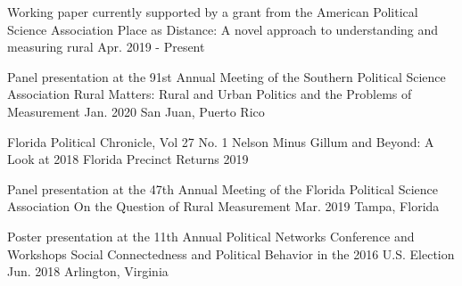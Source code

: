 

\begin{cventries}


\cventry
  {Working paper currently supported by a grant from the American Political Science Association} %
  {Place as Distance: A novel approach to understanding and measuring rural} %
  {Apr. 2019 - Present} %
  {} %
  {}

\vspace{-.25cm}
\cventry
  {Panel presentation at the 91st Annual Meeting of the Southern Political Science Association} %
  {Rural Matters: Rural and Urban Politics and the Problems of Measurement} %
  {Jan. 2020} %
  {San Juan, Puerto Rico} %
  {}

\vspace{-.25cm}
\cventry
  {Florida Political Chronicle, Vol 27 No. 1} %
  {Nelson Minus Gillum and Beyond: A Look at 2018 Florida Precinct Returns} %
  {2019} %
  {} %
  {}

\vspace{-.25cm}
\cventry
  {Panel presentation at the 47th Annual Meeting of the Florida Political Science Association} %
  {On the Question of Rural Measurement} %
  {Mar. 2019} %
  {Tampa, Florida} %
  {}

\vspace{-.25cm}
\cventry
  {Poster presentation at the 11th Annual Political Networks Conference and Workshops} %
  {Social Connectedness and Political Behavior in the 2016 U.S. Election} %
  {Jun. 2018} %
  {Arlington, Virginia} %
  {}

\vspace{-.25cm}


\end{cventries}
